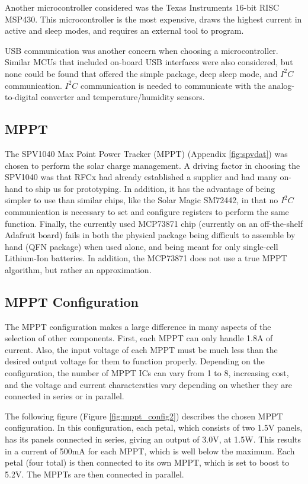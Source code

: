 \documentclass{article}
\numberwithin{figure}{section}
\numberwithin{equation}{section}
\begin{document}
{\bigskip
Another microcontroller considered was the Texas Instruments 16-bit RISC MSP430. This microcontroller is the most expensive, draws the highest current in active and sleep modes, and requires an external tool to program.

\bigskip
USB communication was another concern when choosing a microcontroller. Similar MCUs that included on-board USB interfaces were also considered, but none could be found that offered the simple package, deep sleep mode, and $I^2 C$ communication. $I^2 C$ communication is needed to communicate with the analog-to-digital converter and temperature/humidity sensors.

\subsection{MPPT} \label{sect:mppt_just}
The SPV1040 Max Point Power Tracker (MPPT) (Appendix \ref{fig:spvdat}) was chosen to perform the solar charge management. A driving factor in choosing the SPV1040 was that RFCx had already established a supplier and had many on-hand to ship us for prototyping. In addition, it has the advantage of being simpler to use than similar chips, like the Solar Magic SM72442, in that no $I^2 C$ communication is necessary to set and configure registers to perform the same function. Finally, the currently used MCP73871 chip (currently on an off-the-shelf Adafruit board) fails in both the physical package being difficult to assemble by hand (QFN package) when used alone, and being meant for only single-cell Lithium-Ion batteries. In addition, the MCP73871 does not use a true MPPT algorithm, but rather an approximation.

\subsection{MPPT Configuration} \label{sect:mppt_config_just}
The MPPT configuration makes a large difference in many aspects of the selection of other components. First, each MPPT can only handle 1.8A of current. Also, the input voltage of each MPPT must be much less than the desired output voltage for them to function properly. Depending on the configuration, the number of MPPT ICs can vary from 1 to 8, increasing cost, and the voltage and current characterstics vary depending on whether they are connected in series or in parallel.

\bigskip
The following figure (Figure \ref{fig:mppt_config2}) describes the chosen MPPT configuration. In this configuration, each petal, which consists of two 1.5V panels, has its panels connected in series, giving an output of 3.0V, at 1.5W. This results in a current of 500mA for each MPPT, which is well below the maximum. Each petal (four total) is then connected to its own MPPT, which is set to boost to 5.2V. The MPPTs are then connected in parallel.

}
\end{document}
